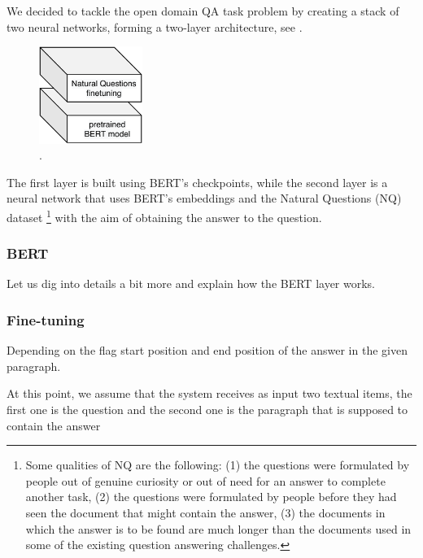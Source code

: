 \documentclass[11pt,hidelinks]{article}
\begin{document}
We decided to tackle the open domain QA task problem by creating a stack of two neural networks, forming a two-layer architecture, see .

\begin{figure}[ht!]
    \centering
    \includegraphics[width=0.3\textwidth]{pics/broad_architecture.pdf}
    \caption{.}
    \label{fig:broad_architecture}
\end{figure}

The first layer is built using BERT's \cite{devlin2018bert} checkpoints, while the second layer is a neural network that uses BERT's embeddings and the Natural Questions (NQ) \cite{kwiatowski} dataset \footnote{Some qualities of NQ are the following: (1) the questions were formulated by people out of genuine curiosity or out of need for an answer to complete another task, (2) the questions were formulated by people before they had seen the document that might contain the answer, (3) the documents in which the answer is to be found are much longer than the documents used in some of the existing question answering challenges.} with the aim of obtaining the answer to the question.

\subsubsection{BERT}
Let us dig into details a bit more and explain how the BERT layer works.

\subsubsection{Fine-tuning}
Depending on the flag
start position and end position of the answer in the given paragraph.









At this point, we assume that the system receives as input two textual items, the first one is the question and the second one is the paragraph that is supposed to contain the answer
\end{document}
